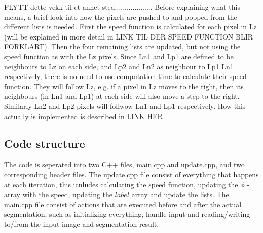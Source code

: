 FLYTT dette vekk til et annet sted...................
Before explaining what this means, a brief look into how the pixels are pushed to and popped from the different lists is needed. First the speed function is calculated for each pixel in Lz (will be explained in more detail in LINK TIL DER SPEED FUNCTION BLIR FORKLART). Then the four remaining lists are updated, but not using the speed function as with the Lz pixels. Since Ln1 and Lp1 are defined to be neighbours to Lz on each side, and Lp2 and Ln2 as neighbour to Lp1 Ln1 respectively, there is no need to use computation time to calculate their speed function. They will follow Lz, e.g. if a pixel in Lz moves to the right, then its neighbours (in Ln1 and Lp1) at each side will also move a step to the right. Similarly Ln2 and Lp2 pixels will follwow Ln1 and Lp1 respectively. How this actually is implemented is described in LINK HER

\subsection{Code structure}
The code is seperated into two C++ files, main.cpp and update.cpp, and two corresponding header files. The update.cpp file consist of everything that happens at each iteration, this icnludes calculating the speed function, updating the $\phi$ - array with the speed, updating the $label$ array and update the lists. The main.cpp file consist of actions that are executed before and after the actual segmentation, such as initializing everything, handle input and reading/writing to/from the input image and segmentation result. 

